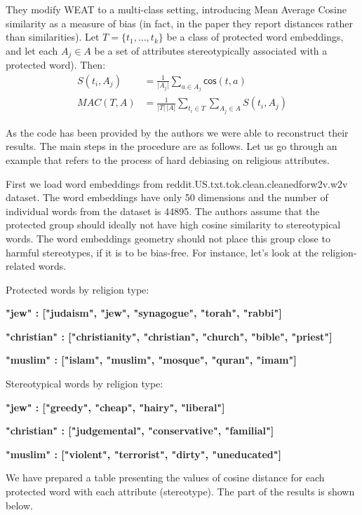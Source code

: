 \documentclass[
  12pt,
]{book}
\begin{document}
They modify WEAT to a multi-class setting, introducing Mean Average Cosine similarity as a measure of bias (in fact, in the paper they report distances rather than similarities). Let \(T = \{t_1, \dots, t_k\}\) be a class of protected word embeddings, and let each \(A_j\in A\) be a set of attributes stereotypically associated with a protected word). Then:
\begin{align}
S(t_i, A_j) & = \frac{1}{\vert A_j\vert}\sum_{a\in A_j}\mathsf{cos}(t,a) \\
MAC(T,A) & = \frac{1}{\vert T \vert \,\vert A\vert}\sum_{t_i \in T }\sum_{A_j \in A} S(t_i,A_j)
\end{align}

As the code has been provided by the authors we were able to reconstruct their results. The main steps in the procedure are as follows. Let us go through an example that refers to the process of hard debiasing on religious attributes.

First we load word embeddings from reddit.US.txt.tok.clean.cleanedforw2v.w2v dataset. The word embeddings have only 50 dimensions and the number of individual words from the dataset is 44895. The authors assume that the protected group should ideally not have high cosine similarity to stereotypical words. The word embeddings geometry should not place this group close to harmful stereotypes, if it is to be bias-free. For instance, let's look at the religion-related words.

Protected words by religion type:

\textbf{"jew"       : ["judaism", "jew", "synagogue", "torah", "rabbi"]}

\textbf{"christian" : ["christianity", "christian", "church", "bible", "priest"]}

\textbf{"muslim"    : ["islam", "muslim", "mosque", "quran", "imam"]}

Stereotypical words by religion type:

\textbf{"jew"       : ["greedy", "cheap", "hairy", "liberal"]}

\textbf{"christian"       : ["judgemental", "conservative", "familial"]}

\textbf{"muslim"       : ["violent", "terrorist", "dirty", "uneducated"]}

We have prepared a table presenting the values of cosine distance for each protected word with each attribute (stereotype). The part of the results is shown below.

\footnotesize
\end{document}
